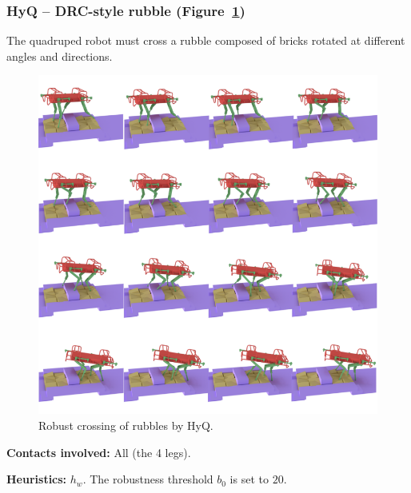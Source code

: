 \documentclass[journal]{IEEEtran}
\newcommand{\gls}[1]{\textit{#1}}
\begin{document}
\subsubsection{HyQ -- DRC-style rubble (Figure~\ref{fig:darpa})}
The quadruped robot must cross a rubble composed of bricks rotated at different angles and directions.

\begin{figure}
  \centering
  \includegraphics[width=1\linewidth]{figures/darpa}
  \caption{
           Robust crossing of rubbles by HyQ. }
		   \label{fig:darpa}
\end{figure}


\noindent\textbf{Contacts involved:} All (the 4 legs).

\noindent\textbf{Heuristics:} $h_w$. The robustness threshold $b_0$ is set to $20$.

\end{document}
